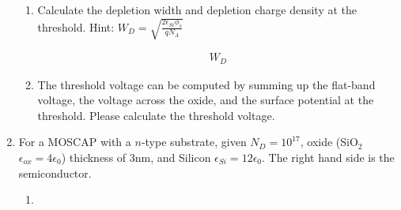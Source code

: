 \begin{enumerate}
\begin{enumerate}
        \item Calculate the depletion width and depletion charge density at the threshold. Hint: {\large $W_D = \sqrt{\frac{2 \epsilon_{Si} \phi_s}{q N_A}}$}
        \begin{Ans}
            \begin{align*}
                W_D
            \end{align*}
        \end{Ans}

        \item The threshold voltage can be computed by summing up the flat-band voltage, the voltage across the oxide, and the surface potential at the threshold. Please calculate the threshold voltage.
    \end{enumerate}

    \item For a MOSCAP with a $n$-type substrate, given $N_D = 10^{17}$\conc, oxide (SiO$_2$ $\epsilon_{ox} = 4\epsilon_0$) thickness of 3nm, and Silicon $\epsilon_{Si} = 12\epsilon_0$. The right hand side is the semiconductor.
    \begin{enumerate}
        \item 
    \end{enumerate}
\end{enumerate}
